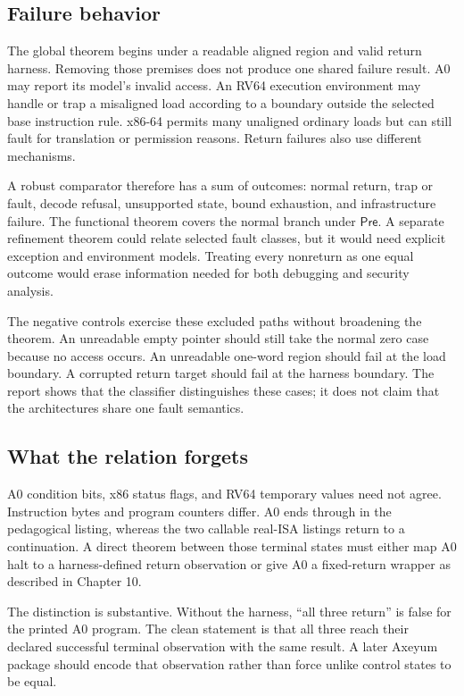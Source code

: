 \subsection{Failure behavior}

The global theorem begins under a readable aligned region and valid return
harness. Removing those premises does not produce one shared failure result.
A0 may report its model's invalid access. An RV64 execution environment may
handle or trap a misaligned load according to a boundary outside the selected
base instruction rule. x86-64 permits many unaligned ordinary loads but can
still fault for translation or permission reasons. Return failures also use
different mechanisms.

A robust comparator therefore has a sum of outcomes: normal return, trap or
fault, decode refusal, unsupported state, bound exhaustion, and infrastructure
failure. The functional theorem covers the normal branch under
\(\mathsf{Pre}\). A separate refinement theorem could relate selected fault
classes, but it would need explicit exception and environment models. Treating
every nonreturn as one equal outcome would erase information needed for both
debugging and security analysis.

The negative controls exercise these excluded paths without broadening the
theorem. An unreadable empty pointer should still take the normal zero case
because no access occurs. An unreadable one-word region should fail at the
load boundary. A corrupted return target should fail at the harness boundary.
The report shows that the classifier distinguishes these cases; it does not
claim that the architectures share one fault semantics.

\subsection{What the relation forgets}

A0 condition bits, x86 status flags, and RV64 temporary values need not agree.
Instruction bytes and program counters differ. A0 ends through  in
the pedagogical listing, whereas the two callable real-ISA listings return to
a continuation. A direct theorem between those terminal states must either
map A0 halt to a harness-defined return observation or give A0 a fixed-return
wrapper as described in Chapter 10.

The distinction is substantive. Without the harness, ``all three return'' is false
for the printed A0 program. The clean statement is that all three reach their
declared successful terminal observation with the same result. A later Axeyum
package should encode that observation rather than force unlike control states
to be equal.

